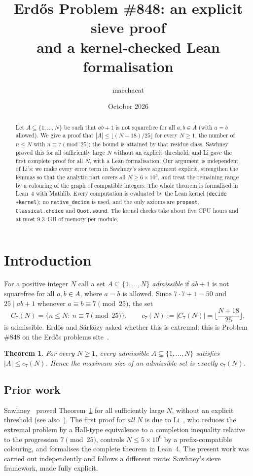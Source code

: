 \documentclass[11pt]{amsart}
\title[Erd\H{o}s Problem \#848]{Erd\H{o}s Problem \#848: an explicit sieve proof\\ and a kernel-checked Lean formalisation}
\author{macchacat}
\date{October 2026}
\newtheorem{theorem}{Theorem}[section]
\theoremstyle{definition}
\theoremstyle{remark}
\begin{document}
\begin{abstract}
Let $A\subseteq\{1,\dots,N\}$ be such that $ab+1$ is not squarefree for all
$a,b\in A$ (with $a=b$ allowed). We give a proof that
$|A|\le\lfloor (N+18)/25\rfloor$ for every $N\ge1$, the number of $n\le N$ with
$n\equiv7\pmod{25}$; the bound is attained by that residue class. Sawhney proved
this for all sufficiently large $N$ without an explicit threshold, and Li gave the
first complete proof for all $N$, with a Lean formalisation. Our argument is
independent of Li's: we make every error term in Sawhney's sieve argument explicit,
strengthen the lemmas so that the analytic part covers all
$N\ge 6\times10^5$, and treat the remaining range by a colouring of the graph of
compatible integers. The whole theorem is formalised in Lean~4 with Mathlib. Every
computation is evaluated by the Lean kernel (\texttt{decide +kernel}); no
\texttt{native\_decide} is used, and the only axioms are \texttt{propext},
\texttt{Classical.choice} and \texttt{Quot.sound}. The kernel checks take about five
CPU hours and at most $9.3$~GB of memory per module.
\end{abstract}

\maketitle

\section{Introduction}

For a positive integer $N$ call a set $A\subseteq\{1,\dots,N\}$
\emph{admissible} if $ab+1$ is not squarefree for all $a,b\in A$, where $a=b$ is
allowed. Since $7\cdot7+1=50$ and $25\mid ab+1$ whenever
$a\equiv b\equiv7\pmod{25}$, the set
\[
  C_7(N)=\{n\le N:\ n\equiv7\pmod{25}\},\qquad
  c_7(N):=|C_7(N)|=\Big\lfloor\frac{N+18}{25}\Big\rfloor ,
\]
is admissible. Erd\H{o}s and S\'ark\"ozy asked whether this is extremal; this is
Problem \#848 on the Erd\H{o}s problems site~\cite{EP848}.

\begin{theorem}\label{thm:main}
For every $N\ge1$, every admissible $A\subseteq\{1,\dots,N\}$ satisfies
$|A|\le c_7(N)$. Hence the maximum size of an admissible set is exactly $c_7(N)$.
\end{theorem}

\subsection*{Prior work}
Sawhney~\cite{Sawhney} proved Theorem~\ref{thm:main} for all sufficiently large
$N$, without an explicit threshold (see also~\cite[\S IV.1]{AI2511}). The first
proof for \emph{all} $N$ is due to Li~\cite{Li,LiRepo}, who reduces the extremal
problem by a Hall-type equivalence to a completion inequality relative to the
progression $7\pmod{25}$, controls $N\le5\times10^6$ by a prefix-compatible
colouring, and formalises the complete theorem in Lean~4. The present work was
carried out independently and follows a different route: Sawhney's sieve
framework, made fully explicit.
\end{document}
